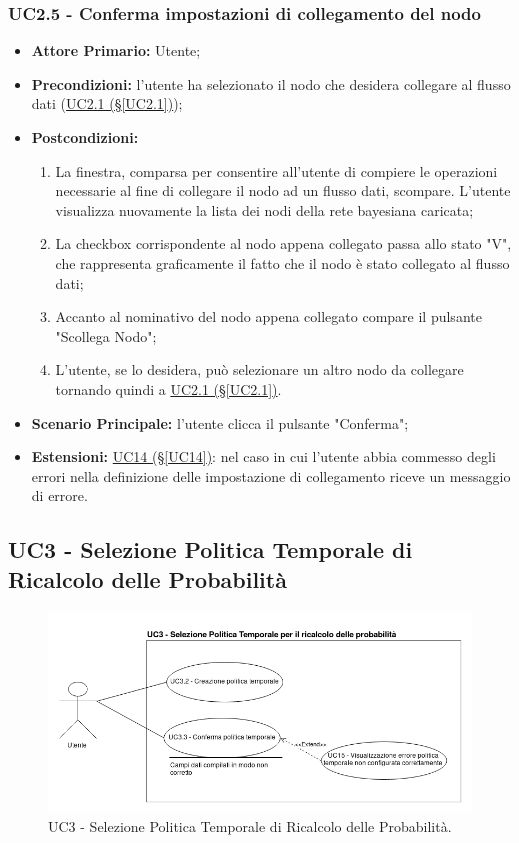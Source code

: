 \subsubsection{UC2.5 - Conferma impostazioni di collegamento del nodo}\label{UC2.5}
\begin{itemize}
\item \textbf{Attore Primario:} Utente;
\item \textbf{Precondizioni:} l'utente ha selezionato il nodo che desidera collegare al flusso dati 					(\hyperref[UC2.1]{UC2.1 (§\ref*{UC2.1})});
\item \textbf{Postcondizioni:}
	\begin{enumerate}
	\item La finestra, comparsa per consentire all'utente di compiere le operazioni necessarie al fine di collegare il 		nodo ad un flusso dati, scompare. L'utente visualizza nuovamente la lista dei nodi della rete bayesiana caricata;
	\item La checkbox corrispondente al nodo appena collegato passa allo stato "V", che rappresenta graficamente il fatto che il nodo è stato collegato al flusso dati;
	\item Accanto al nominativo del nodo appena collegato compare il pulsante "Scollega Nodo";
	\item L'utente, se lo desidera, può selezionare un altro nodo da collegare tornando quindi a \hyperref[UC2.1]{UC2.1 (§\ref*{UC2.1})}.
	\end{enumerate}
\item \textbf{Scenario Principale:} l'utente clicca il pulsante "Conferma";
\item \textbf{Estensioni:} \hyperref[UC14]{UC14 (§\ref*{UC14})}: nel caso in cui l'utente abbia commesso degli errori nella definizione delle impostazione di collegamento riceve un messaggio di errore.
\end{itemize}

\pagebreak

\subsection{UC3 - Selezione Politica Temporale di Ricalcolo delle Probabilità}\label{UC3}

\begin{figure}[H]
\centering
\includegraphics[scale=0.5]{./images/UC3.png}
\caption{UC3 - Selezione Politica Temporale di Ricalcolo delle Probabilità.}
\end{figure}

